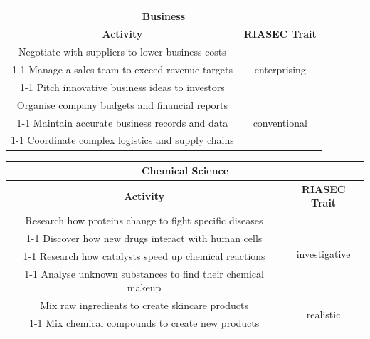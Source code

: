 \begin{table}[H]
\centering
\begin{tabular}{|c|c|}
\hline
\multicolumn{2}{|c|}{\textbf{Business}}\\
\hline
\hline
\textbf{Activity} & \textbf{RIASEC Trait}\\
\hline
Negotiate with suppliers to lower business costs & \multirow{3}{*}{enterprising}\\
\cline{1-1}
Manage a sales team to exceed revenue targets & \\
\cline{1-1}
Pitch innovative business ideas to investors & \\
\hline
Organise company budgets and financial reports & \multirow{3}{*}{conventional}\\
\cline{1-1}
Maintain accurate business records and data & \\
\cline{1-1}
Coordinate complex logistics and supply chains & \\
\hline
\end{tabular}
\end{table}

\begin{table}[H]
\centering
\begin{tabular}{|c|c|}
\hline
\multicolumn{2}{|c|}{\textbf{Chemical Science}}\\
\hline
\hline
\textbf{Activity} & \textbf{RIASEC Trait}\\
\hline
Research how proteins change to fight specific diseases & \multirow{4}{*}{investigative}\\
\cline{1-1}
Discover how new drugs interact with human cells & \\
\cline{1-1}
Research how catalysts speed up chemical reactions & \\
\cline{1-1}
Analyse unknown substances to find their chemical makeup & \\
\hline
Mix raw ingredients to create skincare products & \multirow{2}{*}{realistic}\\
\cline{1-1}
Mix chemical compounds to create new products & \\
\hline
\end{tabular}
\end{table}

